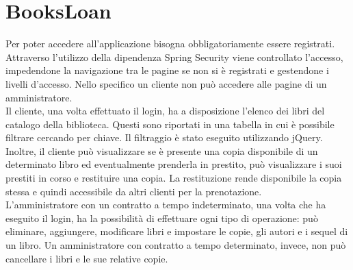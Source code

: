 \documentclass[a4paper,10pt]{article}
\begin{document}
\section*{BooksLoan}
Per poter accedere all’applicazione bisogna obbligatoriamente essere registrati. Attraverso l'utilizzo della dipendenza Spring Security viene controllato l'accesso, impedendone la navigazione tra le pagine se non si è registrati e gestendone i livelli d'accesso. Nello specifico un cliente non può accedere alle pagine di un amministratore.\\

\noindent Il cliente, una volta effettuato il login, ha a disposizione l'elenco dei libri del catalogo della biblioteca. Questi sono riportati in una tabella in cui è possibile filtrare cercando per chiave. Il filtraggio è stato eseguito utilizzando jQuery. Inoltre, il cliente può visualizzare se è presente una copia disponibile di un determinato libro ed eventualmente prenderla in prestito, può visualizzare i suoi prestiti in corso e restituire una copia. La restituzione rende disponibile la copia stessa e quindi accessibile da altri clienti per la prenotazione.\\

\noindent L'amministratore con un contratto a tempo indeterminato, una volta che ha eseguito il login, ha la possibilità di effettuare ogni tipo di operazione: può eliminare, aggiungere, modificare libri e impostare le copie, gli autori e i sequel di un libro.
Un amministratore con contratto a tempo determinato, invece, non può cancellare i libri e le sue relative copie.
\end{document}
